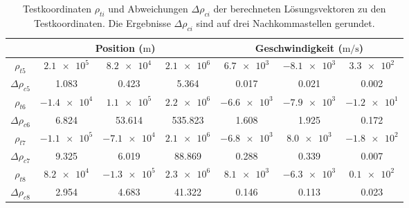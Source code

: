 \documentclass[a4paper,12pt]{article}
\numberwithin{equation}{section}
\begin{document}
\begin{table}[ht]
\renewcommand{\arraystretch}{1.1}
\centering
\begin{tabular}{|c|c|c|c|c|c|c|}
\cline{2-7}
\multicolumn{1}{c|}{} & \multicolumn{3}{c|}{Position ($\si{\meter}$)} & \multicolumn{3}{c|}{Geschwindigkeit ($\si{\meter\per\second}$)} \\
\cline{2-7}\hline
$\rho_{t5}$ & $\num{2.1e5}$ & $\num{8.2e4}$ & $\num{2.1e6}$ & $\num{6.7e3} $ & $\num{-8.1e3}$ & $\num{3.3e2}$ \\
$\Delta \rho_{c5}$ & 1.083 & 0.423 & 5.364 & 0.017 & 0.021 & 0.002 \\
\hline
$\rho_{t6}$ & $\num{-1.4e4}$ & $\num{1.1e5}$ & $\num{2.2e6}$ & $\num{-6.6e3}$ & $\num{-7.9e3}$ & $\num{-1.2e1}$ \\
$\Delta \rho_{c6}$ & 6.824 & 53.614 & 535.823 & 1.608 & 1.925 & 0.172 \\
\hline
$\rho_{t7}$ & $\num{-1.1e5}$ & $\num{-7.1e4}$ & $\num{2.1e6}$ & $\num{-6.8e3}$ & $\num{8.0e3}$ & $\num{-1.8e2}$ \\
$\Delta \rho_{c7}$ & 9.325 & 6.019 & 88.869 & 0.288 & 0.339 & 0.007 \\
\hline
$\rho_{t8}$ & $\num{8.2e4}$ & $\num{-1.3e5}$ & $\num{2.3e6}$ & $\num{8.1e3}$ & $\num{-6.3e3}$ & $\num{0.1e2}$ \\
$\Delta \rho_{c8}$ & 2.954 & 4.683 & 41.322 & 0.146 & 0.113 & 0.023 \\
\hline
\end{tabular}
\caption{Testkoordinaten $\rho_{ti}$ und Abweichungen $\Delta \rho_{ci}$ der berechneten Lösungsvektoren zu den Testkoordinaten. Die Ergebnisse $\Delta \rho_{ci}$ sind auf drei Nachkommastellen gerundet.}
\label{tab:testconfig2}
\end{table}
\end{document}
